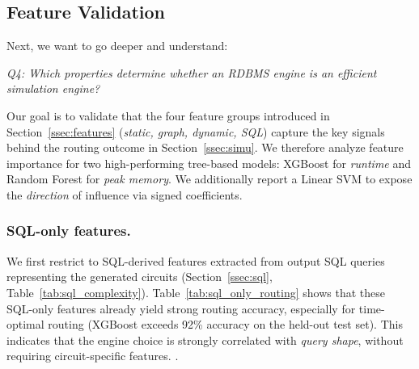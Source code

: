 \subsection{Feature Validation}
\label{ssec:feat_val}













Next, we want to go deeper and understand:

\noindent\emph{Q4: Which properties determine whether an RDBMS engine is an efficient simulation engine?}

Our goal is to validate that the four feature groups introduced in Section~\ref{ssec:features}
(\emph{static, graph, dynamic, SQL}) capture the key signals behind the routing outcome in
Section~\ref{ssec:simu}. 
We therefore analyze feature importance for two high-performing tree-based models: XGBoost for \emph{runtime} and Random Forest for \emph{peak memory}.
We additionally report a
Linear SVM to expose the \emph{direction} of influence via signed coefficients. 




\subsubsection{SQL-only features.}
\label{ssec:sqlonly}
We first restrict to SQL-derived features extracted from output SQL queries representing the generated circuits
(Section~\ref{ssec:sql}, Table~\ref{tab:sql_complexity}).
Table~\ref{tab:sql_only_routing} shows that these SQL-only features already yield strong routing
accuracy, especially for time-optimal routing (XGBoost exceeds 92\% accuracy on the held-out
test set). This indicates that the engine choice is strongly correlated with \emph{query shape},
without requiring circuit-specific features. .

